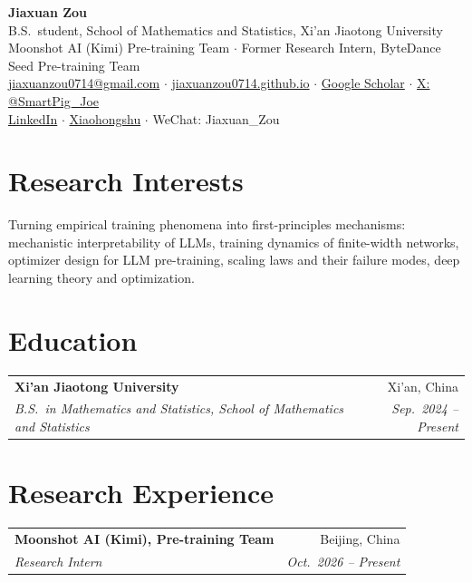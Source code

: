\documentclass[10pt,a4paper]{article}
\makeatletter
\newcommand{\entry}[4]{%
  \begin{tabular*}{\textwidth}{@{}p{0.735\textwidth}@{\extracolsep{\fill}}r@{}}
    \textbf{#1} & #2 \\
    \textit{#3} & \textit{#4} \\
  \end{tabular*}%
  \vspace{0.18em}%
}
\makeatother
\begin{document}
\begin{center}
  {\huge\bfseries Jiaxuan Zou}\\[0.25em]
  {\small
    B.S.\ student, School of Mathematics and Statistics, Xi'an Jiaotong University\\[0.15em]
    Moonshot AI (Kimi) Pre-training Team \;\textbf{$\cdot$}\; Former Research Intern, ByteDance Seed Pre-training Team
  }\\[0.3em]
  {\small
    \href{mailto:jiaxuanzou0714@gmail.com}{jiaxuanzou0714@gmail.com}
    \;\textbf{$\cdot$}\;
    \href{https://jiaxuanzou0714.github.io}{jiaxuanzou0714.github.io}
    \;\textbf{$\cdot$}\;
    \href{https://scholar.google.com/citations?user=YE6iiwUAAAAJ}{Google Scholar}
    \;\textbf{$\cdot$}\;
    \href{https://x.com/SmartPig_Joe}{X: @SmartPig\_Joe}\\[0.12em]
    \href{https://www.linkedin.com/in/\%E5\%98\%89\%E8\%BD\%A9-\%E9\%82\%B9-bb3439341}{LinkedIn}
    \;\textbf{$\cdot$}\;
    \href{https://www.xiaohongshu.com/user/profile/65fc3374000000000b00d833}{Xiaohongshu}
    \;\textbf{$\cdot$}\;
    WeChat: Jiaxuan\_Zou
  }
\end{center}
\vspace{-0.4em}

\section*{Research Interests}
\vspace{-0.15em}
Turning empirical training phenomena into first-principles mechanisms: mechanistic interpretability of LLMs,
training dynamics of finite-width networks, optimizer design for LLM pre-training, scaling laws and their
failure modes, deep learning theory and optimization.

\section*{Education}
\entry{Xi'an Jiaotong University}{Xi'an, China}
      {B.S.\ in Mathematics and Statistics, School of Mathematics and Statistics}{Sep.\ 2024 -- Present}

\section*{Research Experience}
\entry{Moonshot AI (Kimi), Pre-training Team}{Beijing, China}
      {Research Intern}{Oct.\ 2026 -- Present}
\end{document}
